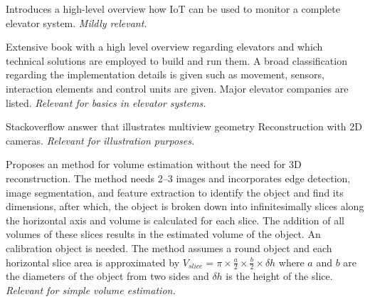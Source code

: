 Introduces a high-level overview how IoT can be used to monitor a complete elevator system.
\emph{Mildly relevant.}


Extensive book with a high level overview regarding elevators and which technical solutions are employed to build and run them. A broad classification regarding the implementation details is given such as movement, sensors, interaction elements and control units are given. Major elevator companies are listed. \emph{Relevant for basics in elevator systems.}





Stackoverflow answer that illustrates multiview geometry Reconstruction with 2D cameras.
\emph{Relevant for illustration purposes.}







Proposes an method for volume estimation without the need for 3D reconstruction.
The method needs 2--3 images and incorporates edge
detection, image segmentation, and feature extraction to
identify the object and find its dimensions, after which,
the object is broken down into infinitesimally slices along
the horizontal axis and volume is calculated for each
slice. The addition of all volumes of these slices results in
the estimated volume of the object.
An calibration object is needed.
The method assumes a round object and each horizontal slice area is approximated by 
$V_{slice} = \pi \times \frac{a}{2} \times \frac{b}{2} \times \delta{}h$ 
where $a$ and $b$ are the diameters of the object from  two sides and $\delta{}h$ is the height of the slice.
\emph{Relevant for simple volume estimation.}


